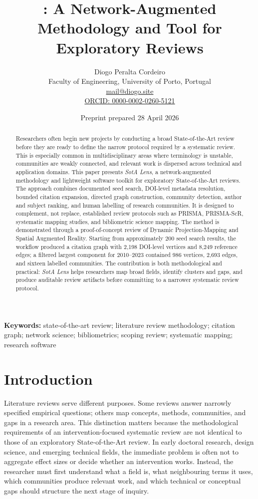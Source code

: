 \documentclass[11pt,a4paper]{article}
\title{\tool: A Network-Augmented Methodology and Tool for Exploratory \sota{} Reviews}
\author{Diogo Peralta Cordeiro\\
Faculty of Engineering, University of Porto, Portugal\\
\href{mailto:mail@diogo.site}{mail@diogo.site}\\
\href{https://orcid.org/0000-0002-0260-5121}{ORCID: 0000-0002-0260-5121}}
\date{Preprint prepared 28 April 2026}
\newcommand{\tool}{\emph{SotA Lens}}
\newcommand{\sota}{State-of-the-Art}
\newcommand{\dpm}{Dynamic Projection-Mapping}
\newcommand{\sar}{Spatial Augmented Reality}
\begin{document}
\maketitle

\begin{abstract}
Researchers often begin new projects by conducting a broad \sota{} review before they are ready to define the narrow protocol required by a systematic review. This is especially common in multidisciplinary areas where terminology is unstable, communities are weakly connected, and relevant work is dispersed across technical and application domains. This paper presents \tool, a network-augmented methodology and lightweight software toolkit for exploratory \sota{} reviews. The approach combines documented seed search, DOI-level metadata resolution, bounded citation expansion, directed graph construction, community detection, author and subject ranking, and human labelling of research communities. It is designed to complement, not replace, established review protocols such as PRISMA, PRISMA-ScR, systematic mapping studies, and bibliometric science mapping. The method is demonstrated through a proof-of-concept review of \dpm{} and \sar{}. Starting from approximately 200 seed search results, the workflow produced a citation graph with 2,198 DOI-level vertices and 8,249 reference edges; a filtered largest component for 2010--2023 contained 986 vertices, 2,693 edges, and sixteen labelled communities. The contribution is both methodological and practical: \tool{} helps researchers map broad fields, identify clusters and gaps, and produce auditable review artifacts before committing to a narrower systematic review protocol.
\end{abstract}

\noindent\textbf{Keywords:} state-of-the-art review; literature review methodology; citation graph; network science; bibliometrics; scoping review; systematic mapping; research software

\section{Introduction}

Literature reviews serve different purposes. Some reviews answer narrowly specified empirical questions; others map concepts, methods, communities, and gaps in a research area. This distinction matters because the methodological requirements of an intervention-focused systematic review are not identical to those of an exploratory \sota{} review. In early doctoral research, design science, and emerging technical fields, the immediate problem is often not to aggregate effect sizes or decide whether an intervention works. Instead, the researcher must first understand what a field is, what neighbouring terms it uses, which communities produce relevant work, and which technical or conceptual gaps should structure the next stage of inquiry.
\end{document}
